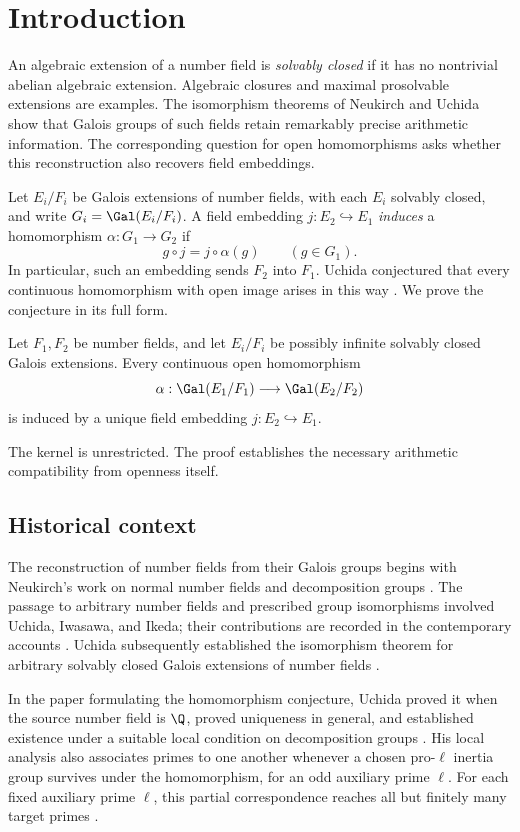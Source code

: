 \section{Introduction}\label{sec:introduction}

An algebraic extension of a number field is \emph{solvably closed} if it has no nontrivial abelian algebraic extension. Algebraic closures and maximal prosolvable extensions are examples. The isomorphism theorems of Neukirch and Uchida show that Galois groups of such fields retain remarkably precise arithmetic information. The corresponding question for open homomorphisms asks whether this reconstruction also recovers field embeddings.

Let $E_i/F_i$ be Galois extensions of number fields, with each $E_i$ solvably closed, and write $G_i=\Gal(E_i/F_i)$. A field embedding $j:E_2\hookrightarrow E_1$ \emph{induces} a homomorphism $\alpha:G_1\to G_2$ if
\[
 g\circ j=j\circ\alpha(g)\qquad(g\in G_1).
\]
In particular, such an embedding sends $F_2$ into $F_1$. Uchida conjectured that every continuous homomorphism with open image arises in this way \cite[p.~595]{uchida1981}. We prove the conjecture in its full form.

\begin{theorem}\label{thm:main}
Let $F_1,F_2$ be number fields, and let $E_i/F_i$ be possibly infinite solvably closed Galois extensions. Every continuous open homomorphism
\[
 \alpha:\Gal(E_1/F_1)\longrightarrow\Gal(E_2/F_2)
\]
is induced by a unique field embedding $j:E_2\hookrightarrow E_1$.
\end{theorem}

The kernel is unrestricted. The proof establishes the necessary arithmetic compatibility from openness itself.

\subsection{Historical context}
The reconstruction of number fields from their Galois groups begins with Neukirch's work on normal number fields and decomposition groups \cite{neukirch1969a,neukirch1969b}. The passage to arbitrary number fields and prescribed group isomorphisms involved Uchida, Iwasawa, and Ikeda; their contributions are recorded in the contemporary accounts \cite{uchida1976,neukirch1977}. Uchida subsequently established the isomorphism theorem for arbitrary solvably closed Galois extensions of number fields \cite{uchida1979}.

In the paper formulating the homomorphism conjecture, Uchida proved it when the source number field is $\Q$, proved uniqueness in general, and established existence under a suitable local condition on decomposition groups \cite[Theorem~1, Proposition~2, and Theorem~2]{uchida1981}. His local analysis also associates primes to one another whenever a chosen pro-$\ell$ inertia group survives under the homomorphism, for an odd auxiliary prime $\ell$. For each fixed auxiliary prime $\ell$, this partial correspondence reaches all but finitely many target primes \cite[Proposition~1]{uchida1981}.


